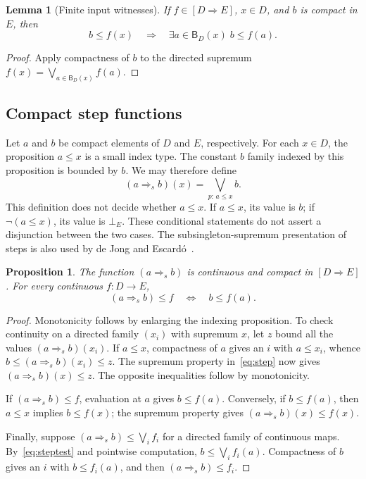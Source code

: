 \documentclass[11pt,a4paper]{article}
\newtheorem{lemma}[theorem]{Lemma}
\newtheorem{proposition}[theorem]{Proposition}
\theoremstyle{definition}
\theoremstyle{remark}
\newcommand{\B}{\mathsf B}
\newcommand{\Cont}[2]{[#1\mathbin{\Rightarrow}#2]}
\newcommand{\step}[2]{(#1\mathbin{\Rightarrow}_{\!s}#2)}
\newcommand{\lub}{\bigvee}
\begin{document}
\begin{lemma}[Finite input witnesses]\label{lem:witness}
If $f\in\Cont D E$, $x\in D$, and $b$ is compact in $E$, then
\[
 b\leq f(x)
 \quad\Longrightarrow\quad
 \exists a\in\B_D(x)\; b\leq f(a).
\]
\end{lemma}
\begin{proof}
Apply compactness of $b$ to the directed supremum
$f(x)=\lub_{a\in\B_D(x)}f(a)$.
\end{proof}

\subsection{Compact step functions}

Let $a$ and $b$ be compact elements of $D$ and $E$, respectively.
For each $x\in D$, the proposition $a\leq x$ is a small index type.
The constant $b$ family indexed by this proposition is bounded by $b$.
We may therefore define
\begin{equation}\label{eq:step}
 \step a b(x)=\lub_{p:\,a\leq x} b.
\end{equation}
This definition does not decide whether $a\leq x$. If $a\leq x$, its
value is $b$; if $\neg(a\leq x)$, its value is $\bot_E$. These conditional
statements do not assert a disjunction between the two cases.
The subsingleton-supremum presentation of steps is also used by
de Jong and Escard\'o~\cite{dejong-escardo}.

\begin{proposition}\label{prop:step}
The function $\step a b$ is continuous and compact in $\Cont D E$.
For every continuous $f:D\to E$,
\begin{equation}\label{eq:steptest}
 \step a b\leq f \quad\Longleftrightarrow\quad b\leq f(a).
\end{equation}
\end{proposition}
\begin{proof}
Monotonicity follows by enlarging the indexing proposition. To check
continuity on a directed family $(x_i)$ with supremum $x$, let $z$ bound
all the values $\step a b(x_i)$. If $a\leq x$, compactness of $a$ gives
an $i$ with $a\leq x_i$, whence $b\leq\step a b(x_i)\leq z$.
The supremum property in~\eqref{eq:step} now gives $\step a b(x)\leq z$.
The opposite inequalities follow by monotonicity.

If $\step a b\leq f$, evaluation at $a$ gives $b\leq f(a)$.
Conversely, if $b\leq f(a)$, then $a\leq x$ implies $b\leq f(x)$;
the supremum property gives $\step a b(x)\leq f(x)$.

Finally, suppose $\step a b\leq\lub_i f_i$ for a directed family of
continuous maps. By~\eqref{eq:steptest} and pointwise computation,
$b\leq\lub_i f_i(a)$. Compactness of $b$ gives an $i$ with
$b\leq f_i(a)$, and then $\step a b\leq f_i$.
\end{proof}
\end{document}
